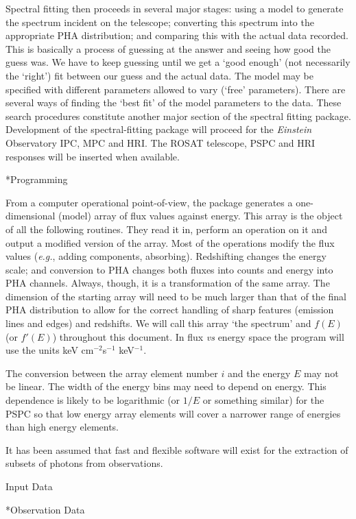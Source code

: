 Spectral fitting then proceeds in several major stages:  using a model to
generate the
spectrum incident on the telescope; converting this spectrum into the
appropriate PHA distribution; and comparing this with the
actual data recorded.  This is basically a process of guessing at the
answer and seeing how good the guess was.  We have to keep guessing until we
get a `good enough' (not necessarily the `right') fit between our guess and the actual
data.  The model may be specified with different parameters allowed to vary
(`free' parameters).  There are several ways of finding the `best fit' of
the model parameters to the data.  These search
procedures constitute another major section of the spectral fitting
package.  Development of the spectral-fitting package will proceed for
the {\it Einstein} Observatory IPC, MPC and HRI.  The ROSAT telescope, 
PSPC and HRI responses will be inserted when available.

\**Programming

From a computer operational point-of-view, the package generates a
one-dimensional (model) array of flux values against energy.  This array is the object
of all the following routines.  They read it in, perform an operation on it
and output a modified version of the array.  Most of the operations modify
the flux values ({\it e.g.}, adding components, absorbing).  Redshifting changes
the energy scale; and conversion to PHA changes both fluxes into counts and
energy into PHA channels.  Always, though, it is a transformation of the same
array.  The dimension of the starting array will need to be much larger than
that of the final PHA distribution to allow for the correct handling of sharp
features (emission lines and edges) and redshifts.  We will call this array
`the spectrum' and $f(E)$ (or $f'(E)$) throughout this document.  In
flux {\it vs} energy
space the program will use the units keV cm$^{-2}$s$^{-1}$ keV$^{-1}$.

The conversion between the array element number $i$ and the energy $E$ may not
be linear.  The width of the energy bins may need to depend on energy.  This
dependence is likely to be logarithmic (or $1/E$ or something similar)
for the PSPC so that low energy array elements will cover a
narrower range of energies than high energy elements.

It has been assumed that fast and flexible software will exist for the
extraction of subsets of photons from observations.

\@{Input Data}

\**Observation Data

